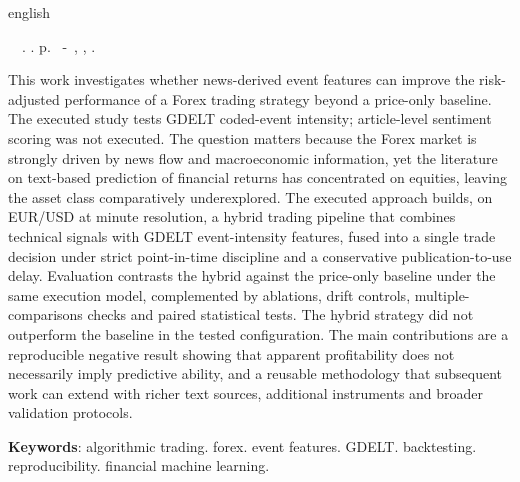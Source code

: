 \setlength{\absparsep}{18pt}
\begin{resumo}[Abstract]
 \begin{otherlanguage*}{english}
    \begin{flushleft}
        \setlength{\absparsep}{0pt}
        \SingleSpacing  		\imprimirautorabr~~\textbf{\imprimirtitleabstract}.	\imprimirdata.  \pageref{LastPage} p.
        \imprimirtipotrabalhoabs~-~\imprimirinstituicao, \imprimirlocal, 	\imprimirdata.
    \end{flushleft}
    \OnehalfSpacing
   This work investigates whether news-derived event features can improve the risk-adjusted performance of a Forex trading strategy beyond a price-only baseline. The executed study tests GDELT coded-event intensity; article-level sentiment scoring was not executed. The question matters because the Forex market is strongly driven by news flow and macroeconomic information, yet the literature on text-based prediction of financial returns has concentrated on equities, leaving the asset class comparatively underexplored. The executed approach builds, on EUR/USD at minute resolution, a hybrid trading pipeline that combines technical signals with GDELT event-intensity features, fused into a single trade decision under strict point-in-time discipline and a conservative publication-to-use delay. Evaluation contrasts the hybrid against the price-only baseline under the same execution model, complemented by ablations, drift controls, multiple-comparisons checks and paired statistical tests. The hybrid strategy did not outperform the baseline in the tested configuration. The main contributions are a reproducible negative result showing that apparent profitability does not necessarily imply predictive ability, and a reusable methodology that subsequent work can extend with richer text sources, additional instruments and broader validation protocols.

   \noindent
   \textbf{Keywords}: algorithmic trading. forex. event features. GDELT. backtesting. reproducibility. financial machine learning.
 \end{otherlanguage*}
\end{resumo}
